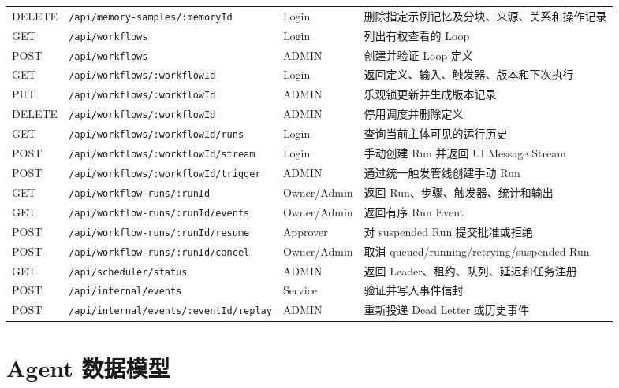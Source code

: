 \documentclass[conference,10pt]{IEEEtran}
\newcommand{\code}[1]{\texttt{#1}}
\begin{document}
\begin{table}[htbp]
\begin{tabularx}{\textwidth}{p{1.6cm}p{5.8cm}p{2.1cm}Y}
DELETE & \code{/api/memory-samples/:memoryId} & Login & 删除指定示例记忆及分块、来源、关系和操作记录 \\
GET & \code{/api/workflows} & Login & 列出有权查看的 Loop \\
POST & \code{/api/workflows} & ADMIN & 创建并验证 Loop 定义 \\
GET & \code{/api/workflows/:workflowId} & Login & 返回定义、输入、触发器、版本和下次执行 \\
PUT & \code{/api/workflows/:workflowId} & ADMIN & 乐观锁更新并生成版本记录 \\
DELETE & \code{/api/workflows/:workflowId} & ADMIN & 停用调度并删除定义 \\
GET & \code{/api/workflows/:workflowId/runs} & Login & 查询当前主体可见的运行历史 \\
POST & \code{/api/workflows/:workflowId/stream} & Login & 手动创建 Run 并返回 UI Message Stream \\
POST & \code{/api/workflows/:workflowId/trigger} & ADMIN & 通过统一触发管线创建手动 Run \\
GET & \code{/api/workflow-runs/:runId} & Owner/Admin & 返回 Run、步骤、触发器、统计和输出 \\
GET & \code{/api/workflow-runs/:runId/events} & Owner/Admin & 返回有序 Run Event \\
POST & \code{/api/workflow-runs/:runId/resume} & Approver & 对 suspended Run 提交批准或拒绝 \\
POST & \code{/api/workflow-runs/:runId/cancel} & Owner/Admin & 取消 queued/running/retrying/suspended Run \\
GET & \code{/api/scheduler/status} & ADMIN & 返回 Leader、租约、队列、延迟和任务注册 \\
POST & \code{/api/internal/events} & Service & 验证并写入事件信封 \\
POST & \code{/api/internal/events/:eventId/replay} & ADMIN & 重新投递 Dead Letter 或历史事件 \\
\bottomrule
\end{tabularx}
\end{table}

\clearpage
\section{Agent 数据模型}
\end{document}
